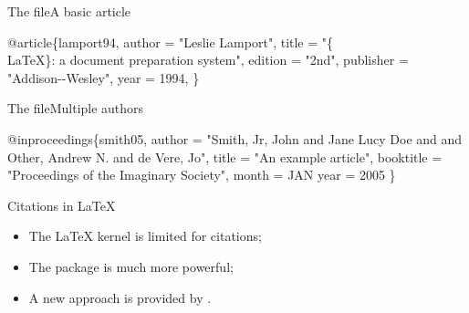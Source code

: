 \begin{frame}[fragile]{The \BibTeX{} file}{A basic article}

  \begin{example}
    \begin{semiverbatim}
\alert<2>{@article}\{\alert<3>{lamport94},
   author    = "Leslie Lamport",
   title     = 
     "\alert<4>{\{\\LaTeX\}}: a document preparation system",
   edition   = "2nd",
   publisher = "Addison-{}-Wesley",
   year      = \alert<5>{1994},
\}
    \end{semiverbatim}
  \end{example}

\end{frame}

\begin{frame}[fragile]{The \BibTeX{} file}{Multiple authors}

  \begin{example}
    \begin{semiverbatim}
@inproceedings\{smith05,
  author    = "Smith, Jr, John \alert<2>{and} Jane Lucy Doe
   \alert<2>{and} and Other, Andrew N. \alert<2>{and} de Vere, Jo",
  title     = "An example article",
  booktitle = "Proceedings of the Imaginary Society",
  month     = JAN
  year      = 2005
\}
    \end{semiverbatim}
  \end{example}

\end{frame}

\begin{frame}[fragile]{Citations in \LaTeX}

  \begin{itemize}
    \item The \LaTeX{} kernel is limited for citations;
    \item The  package is much more powerful;
    \item A new approach is provided by .
  \end{itemize}

\end{frame}

